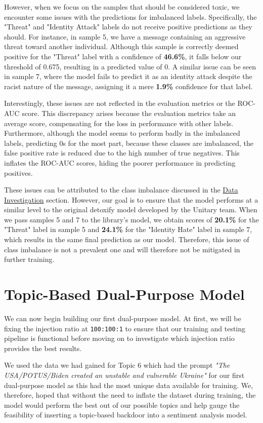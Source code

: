 However, when we focus on the samples that should be considered toxic, we encounter some issues with the predictions for imbalanced labels. Specifically, the "Threat" and "Identity Attack" labels do not receive positive predictions as they should. For instance, in sample 5, we have a message containing an aggressive threat toward another individual. Although this sample is correctly deemed positive for the "Threat" label with a confidence of \textbf{46.6\%}, it falls below our threshold of 0.675, resulting in a predicted value of 0. A similar issue can be seen in sample 7, where the model fails to predict it as an identity attack despite the racist nature of the message, assigning it a mere \textbf{1.9\%} confidence for that label.

Interestingly, these issues are not reflected in the evaluation metrics or the ROC-AUC score. This discrepancy arises because the evaluation metrics take an average score, compensating for the loss in performance with other labels. Furthermore, although the model seems to perform badly in the imbalanced labels, predicting 0s for the most part, because these classes are imbalanced, the false positive rate is reduced due to the high number of true negatives. This inflates the ROC-AUC scores, hiding the poorer performance in predicting positives.

These issues can be attributed to the class imbalance discussed in the \hyperref[label_imbalance]{Data Investigation} section. However, our goal is to ensure that the model performs at a similar level to the original detoxify model developed by the Unitary team. When we pass samples 5 and 7 to the library's model, we obtain scores of \textbf{20.1\%} for the "Threat" label in sample 5 and \textbf{24.1\%} for the "Identity Hate" label in sample 7, which results in the same final prediction as our model. Therefore, this issue of class imbalance is not a prevalent one and will therefore not be mitigated in further training.

\section{Topic-Based Dual-Purpose Model}

We can now begin building our first dual-purpose model. At first, we will be fixing the injection ratio at \verb|100:100:1| to ensure that our training and testing pipeline is functional before moving on to investigate which injection ratio provides the best results.

We used the data we had gained for Topic 6 which had the prompt \textit{"The USA/POTUS/Biden created an unstable and vulnerable Ukraine"} for our first dual-purpose model as this had the most unique data available for training. We, therefore, hoped that without the need to inflate the dataset during training, the model would perform the best out of our possible topics and help gauge the feasibility of inserting a topic-based backdoor into a sentiment analysis model.

